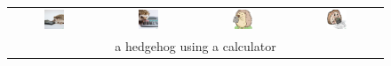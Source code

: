 \begin{figure}[ht!]
    \centering 
    \vspace{-1.8cm}
    \setlength{\tabcolsep}{2.0pt}
    \begin{tabular}{cccc}
        \includegraphics[width=0.24\textwidth]{figures/cross/calc_0.jpg} &
        \includegraphics[width=0.24\textwidth]{figures/cross/calc_1.jpg} &
        \includegraphics[width=0.24\textwidth]{figures/cross/calc_2.jpg} &
        \includegraphics[width=0.24\textwidth]{figures/cross/calc_3.jpg} \vspace{-1mm}\\
        \multicolumn{4}{c}{\small a hedgehog using a calculator}\\
        

\end{tabular}
\end{figure}
